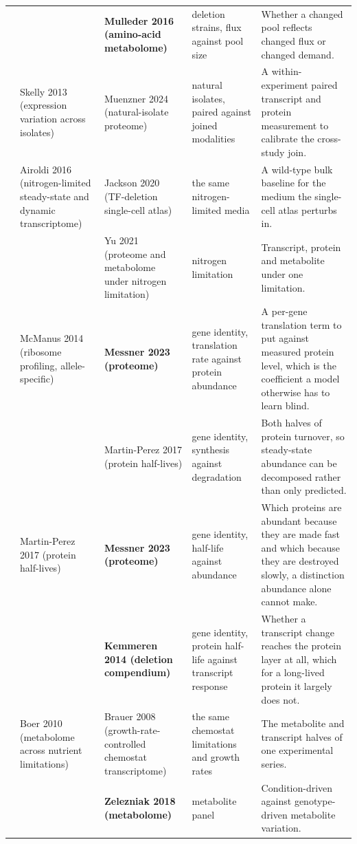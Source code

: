 \begin{landscape}
\begin{longtable}{@{}r@{\hspace{4pt}} L{42mm} L{44mm} L{48mm} L{96mm}@{}}
 &  & \textbf{Mulleder 2016 (amino-acid metabolome)} & deletion strains, flux against pool size & Whether a changed pool reflects changed flux or changed demand. \\
 & Skelly 2013 (expression variation across isolates) & Muenzner 2024 (natural-isolate proteome) & natural isolates, paired against joined modalities & A within-experiment paired transcript and protein measurement to calibrate the cross-study join. \\
 & Airoldi 2016 (nitrogen-limited steady-state and dynamic transcriptome) & Jackson 2020 (TF-deletion single-cell atlas) & the same nitrogen-limited media & A wild-type bulk baseline for the medium the single-cell atlas perturbs in. \\
 &  & Yu 2021 (proteome and metabolome under nitrogen limitation) & nitrogen limitation & Transcript, protein and metabolite under one limitation. \\
 & McManus 2014 (ribosome profiling, allele-specific) & \textbf{Messner 2023 (proteome)} & gene identity, translation rate against protein abundance & A per-gene translation term to put against measured protein level, which is the coefficient a model otherwise has to learn blind. \\
 &  & Martin-Perez 2017 (protein half-lives) & gene identity, synthesis against degradation & Both halves of protein turnover, so steady-state abundance can be decomposed rather than only predicted. \\
 & Martin-Perez 2017 (protein half-lives) & \textbf{Messner 2023 (proteome)} & gene identity, half-life against abundance & Which proteins are abundant because they are made fast and which because they are destroyed slowly, a distinction abundance alone cannot make. \\
 &  & \textbf{Kemmeren 2014 (deletion compendium)} & gene identity, protein half-life against transcript response & Whether a transcript change reaches the protein layer at all, which for a long-lived protein it largely does not. \\
 & Boer 2010 (metabolome across nutrient limitations) & Brauer 2008 (growth-rate-controlled chemostat transcriptome) & the same chemostat limitations and growth rates & The metabolite and transcript halves of one experimental series. \\
 &  & \textbf{Zelezniak 2018 (metabolome)} & metabolite panel & Condition-driven against genotype-driven metabolite variation. \\

\end{longtable}
\end{landscape}
